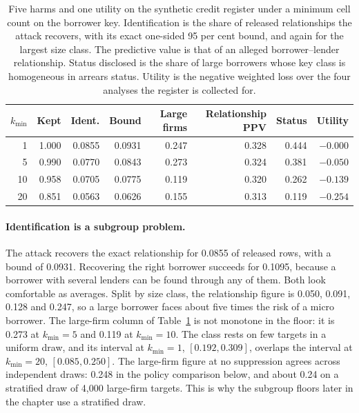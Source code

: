 \begin{table}[ht]
\centering
\caption{Five harms and one utility on the synthetic credit register under a minimum
cell count on the borrower key. Identification is the share of released
relationships the attack recovers, with its exact one-sided 95 per cent bound, and
again for the largest size class. The predictive value is that of an alleged
borrower--lender relationship. Status disclosed is the share of large borrowers whose
key class is homogeneous in arrears status. Utility is the negative weighted loss
over the four analyses the register is collected for.}
\label{c13:tab-harms}
\small\setlength{\tabcolsep}{4pt}
\begin{tabular}{rrrrrrrr}
\toprule
$k_{\min}$ & Kept & Ident. & Bound & Large firms & Relationship PPV & Status & Utility \\
\midrule
1  & 1.000 & 0.0855 & 0.0931 & 0.247 & 0.328 & 0.444 & $-0.000$ \\
5  & 0.990 & 0.0770 & 0.0843 & 0.273 & 0.324 & 0.381 & $-0.050$ \\
10 & 0.958 & 0.0705 & 0.0775 & 0.119 & 0.320 & 0.262 & $-0.139$ \\
20 & 0.851 & 0.0563 & 0.0626 & 0.155 & 0.313 & 0.119 & $-0.254$ \\
\bottomrule
\end{tabular}
\end{table}

\paragraph{Identification is a subgroup problem.} The attack recovers the exact
relationship for 0.0855 of released rows, with a bound of 0.0931. Recovering the right
borrower succeeds for 0.1095, because a borrower with several lenders can be found
through any of them.
Both look comfortable as averages. Split by size class, the relationship figure is
0.050, 0.091, 0.128 and 0.247, so a large borrower faces about five times the risk
of a micro borrower.
The large-firm column of Table~\ref{c13:tab-harms} is not monotone in the floor: it
is 0.273 at $k_{\min}=5$ and 0.119 at $k_{\min}=10$. The class rests on few targets
in a uniform draw, and its interval at $k_{\min}=1$, $[0.192, 0.309]$, overlaps the
interval at $k_{\min}=20$, $[0.085, 0.250]$.
The large-firm figure at no suppression agrees across independent draws: 0.248 in
the policy comparison below, and about 0.24 on a stratified draw of 4{,}000
large-firm targets. This is why the subgroup floors later in the chapter use a
stratified draw.

